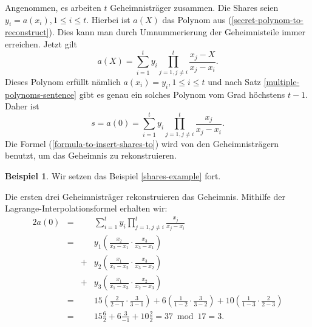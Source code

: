 \documentclass[12pt, a4paper, oneside, titlepage]{report}
\theoremstyle{definition}
\newtheorem{bsp}[lemma]{Beispiel}
\begin{document}
	Angenommen, es arbeiten $ t $ Geheimnisträger zusammen. Die Shares seien $ y_i = a(x_i), 1 \leq i \leq t $. Hierbei ist $ a(X) $ das Polynom aus (\ref{secret-polynom-to-reconstruct}). Dies kann man durch Umnummerierung der Geheimnisteile immer erreichen. Jetzt gilt
	$$ a(X) = \sum_{i=1}^{t} y_i \prod_{j=1, j \neq i}^{t} \frac{x_j - X}{x_j - x_i} . $$
	Dieses Polynom erfüllt nämlich $ a(x_i) = y_i, 1 \leq i \leq t $ und nach Satz \ref{multiple-polynoms-sentence} gibt es genau ein solches Polynom vom Grad höchstens $ t - 1 $. Daher ist
	\begin{equation}\label{formula-to-insert-shares-to}
		s = a(0) = \sum_{i=1}^{t} y_i \prod_{j=1, j \neq i}^{t} \frac{x_j}{x_j - x_i} .
	\end{equation}
	Die Formel (\ref{formula-to-insert-shares-to}) wird von den Geheimnisträgern benutzt, um das Geheimnis zu rekonstruieren.
	\pagebreak
	\begin{bsp}
		Wir setzen das Beispiel \ref{shares-example} fort.

		Die ersten drei Geheimnisträger rekonstruieren das Geheimnis. Mithilfe der Lagrange-Interpolationsformel erhalten wir:		
		\begin{alignat*}{2}
		a(0) & = & & \sum_{i=1}^{t} y_i \prod_{j=1, j \neq i}^{t} \frac{x_j}{x_j - x_i} \\
		       & = & & y_1  \left( \frac{x_2}{x_2 - x_1} \cdot \frac{x_3}{x_3 - x_1} \right) \\
		        &   & + &  y_2  \left( \frac{x_1}{x_1 - x_2} \cdot \frac{x_3}{x_3 - x_2} \right) \\
				&  &  + & y_3  \left( \frac{x_1}{x_1 - x_3} \cdot \frac{x_2}{x_2 - x_3} \right) \\
		& =&& 15 \left( \frac{2}{2 - 1} \cdot \frac{3}{3 - 1} \right) 
		+  6  \left( \frac{1}{1 - 2} \cdot \frac{3}{3 - 2} \right) 
		+ 10  \left( \frac{1}{1 - 3} \cdot \frac{2}{2 - 3} \right)\\
		&=&& 15 \frac{6}{2} + 6 \frac{3}{-1} + 10 \frac{2}{2} = 37 \bmod 17 = 3.
		\end{alignat*}
	\end{bsp}
	
\end{document}
